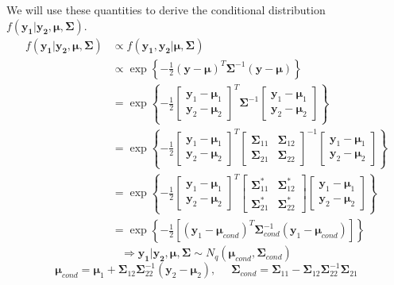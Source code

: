 \documentclass[useAMS,referee]{biom}
\begin{document}
We will use these quantities to derive the conditional distribution $f(\mathbf{y_1}|\mathbf{y_2},\boldsymbol\mu,\boldsymbol\Sigma)$. 
\begin{align*} 
f(\mathbf{y_1}|\mathbf{y_2},\boldsymbol\mu,\boldsymbol\Sigma) & \propto  f(\mathbf{y_1},\mathbf{y_2}|\boldsymbol\mu,\boldsymbol\Sigma) \\
& \propto \exp \left \{ -\frac{1}{2}(\mathbf{y} - \boldsymbol\mu)^T \boldsymbol\Sigma^{-1} (\mathbf{y} - \boldsymbol\mu) \right \} \\
& = \exp \left \{ -\frac{1}{2}\begin{bmatrix} \mathbf{y}_1 - \boldsymbol\mu_1 \\  \mathbf{y}_2 - \boldsymbol\mu_2 \end{bmatrix}^T \boldsymbol\Sigma^{-1} \begin{bmatrix} \mathbf{y}_1 - \boldsymbol\mu_1 \\  \mathbf{y}_2 - \boldsymbol\mu_2 \end{bmatrix} \right \} \\
& =  \exp \left \{ -\frac{1}{2}\begin{bmatrix} \mathbf{y}_1 - \boldsymbol\mu_1 \\  \mathbf{y}_2 - \boldsymbol\mu_2 \end{bmatrix}^T \begin{bmatrix} \boldsymbol\Sigma_{11} & \boldsymbol\Sigma_{12} \\ \boldsymbol\Sigma_{21} & \boldsymbol\Sigma_{22} \end{bmatrix}^{-1} \begin{bmatrix} \mathbf{y}_1 - \boldsymbol\mu_1 \\  \mathbf{y}_2 - \boldsymbol\mu_2 \end{bmatrix} \right \} \\
& = \exp \left \{ -\frac{1}{2}\begin{bmatrix} \mathbf{y}_1 - \boldsymbol\mu_1 \\  \mathbf{y}_2 - \boldsymbol\mu_2 \end{bmatrix}^T \begin{bmatrix} \boldsymbol\Sigma_{11}^* & \boldsymbol\Sigma_{12}^* \\ \boldsymbol\Sigma_{21}^* & \boldsymbol\Sigma_{22}^* \end{bmatrix} \begin{bmatrix} \mathbf{y}_1 - \boldsymbol\mu_1 \\  \mathbf{y}_2 - \boldsymbol\mu_2 \end{bmatrix} \right \} \\
& = \exp \left \{ -\frac{1}{2} \left[ (\mathbf{y}_1 - \boldsymbol\mu_{cond})^T \boldsymbol\Sigma_{cond}^{-1}(\mathbf{y}_1 - \boldsymbol\mu_{cond})\right]\right \} 
\end{align*}
$$\Rightarrow \mathbf{y_1}|\mathbf{y_2},\boldsymbol\mu,\boldsymbol\Sigma \sim N_q(\boldsymbol\mu_{cond},\boldsymbol\Sigma_{cond})$$
$$\boldsymbol\mu_{cond} = \boldsymbol\mu_1 + \boldsymbol\Sigma_{12}\boldsymbol\Sigma_{22}^{-1}(\mathbf{y}_2 - \boldsymbol\mu_2), \ \ \ \ \ \ \boldsymbol\Sigma_{cond} = \boldsymbol\Sigma_{11} - \boldsymbol\Sigma_{12}\boldsymbol\Sigma_{22}^{-1}\boldsymbol\Sigma_{21}$$
\end{document}
